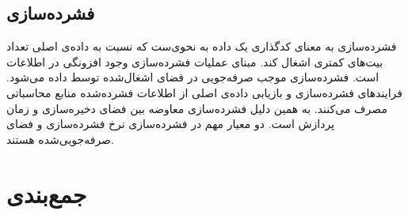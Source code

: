 \subsection{فشرده‌سازی}
فشرده‌سازی به معنای کدگذاری یک داده به نحوی‌ست که نسبت به داده‌ی اصلی تعداد بیت‌های کمتری اشغال کند. مبنای عملیات فشرده‌سازی وجود افزونگی
 در اطلاعات است. فشرده‌سازی موجب صرفه‌جویی در فضای اشغال‌شده توسط داده می‌شود. فرایند‌های فشرده‌سازی و بازیابی داده‌ی اصلی از اطلاعات فشرده‌شده منابع محاسباتی مصرف می‌کنند. به همین دلیل فشرده‌سازی معاوضه بین فضای دخیره‌سازی و زمان پردازش است. دو معیار مهم در فشرده‌سازی نرخ فشرده‌سازی
  و فضای صرفه‌جویی‌شده
  هستند. 

\section{جمع‌بندی}
